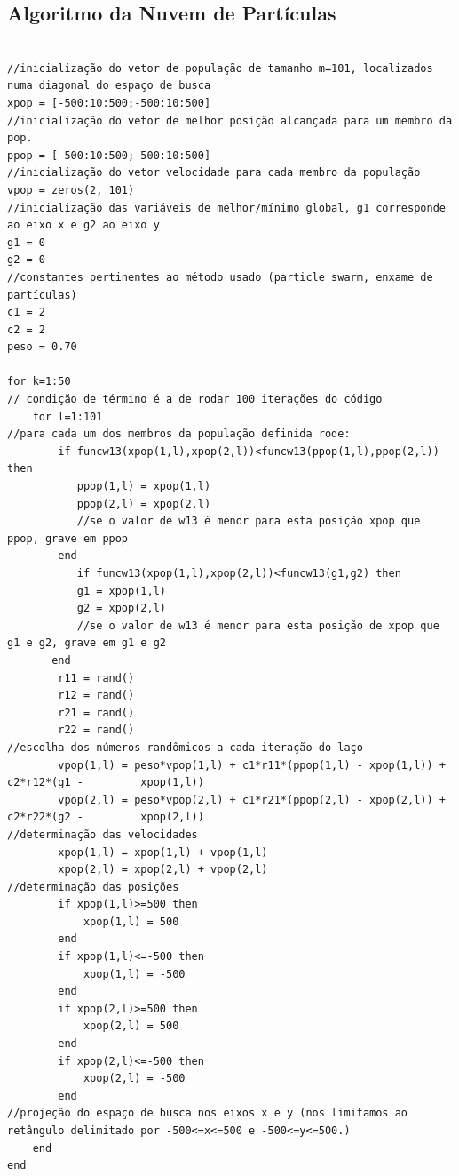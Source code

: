 \subsection*{Algoritmo da Nuvem de Partículas}
\begin{verbatim}

//inicialização do vetor de população de tamanho m=101, localizados numa diagonal do espaço de busca
xpop = [-500:10:500;-500:10:500]
//inicialização do vetor de melhor posição alcançada para um membro da pop.
ppop = [-500:10:500;-500:10:500]
//inicialização do vetor velocidade para cada membro da população
vpop = zeros(2, 101)
//inicialização das variáveis de melhor/mínimo global, g1 corresponde ao eixo x e g2 ao eixo y
g1 = 0
g2 = 0 
//constantes pertinentes ao método usado (particle swarm, enxame de partículas) 
c1 = 2
c2 = 2
peso = 0.70

for k=1:50
// condição de término é a de rodar 100 iterações do código
    for l=1:101
//para cada um dos membros da população definida rode:
        if funcw13(xpop(1,l),xpop(2,l))<funcw13(ppop(1,l),ppop(2,l)) then
           ppop(1,l) = xpop(1,l)
           ppop(2,l) = xpop(2,l)
           //se o valor de w13 é menor para esta posição xpop que ppop, grave em ppop
        end
           if funcw13(xpop(1,l),xpop(2,l))<funcw13(g1,g2) then
           g1 = xpop(1,l)
           g2 = xpop(2,l)
           //se o valor de w13 é menor para esta posição de xpop que g1 e g2, grave em g1 e g2
       end
        r11 = rand()
        r12 = rand()
        r21 = rand()
        r22 = rand()
//escolha dos números randômicos a cada iteração do laço
        vpop(1,l) = peso*vpop(1,l) + c1*r11*(ppop(1,l) - xpop(1,l)) + c2*r12*(g1 -         xpop(1,l))
        vpop(2,l) = peso*vpop(2,l) + c1*r21*(ppop(2,l) - xpop(2,l)) + c2*r22*(g2 -         xpop(2,l))
//determinação das velocidades
        xpop(1,l) = xpop(1,l) + vpop(1,l)
        xpop(2,l) = xpop(2,l) + vpop(2,l)
//determinação das posições
        if xpop(1,l)>=500 then
            xpop(1,l) = 500
        end
        if xpop(1,l)<=-500 then
            xpop(1,l) = -500
        end
        if xpop(2,l)>=500 then
            xpop(2,l) = 500
        end
        if xpop(2,l)<=-500 then
            xpop(2,l) = -500
        end
//projeção do espaço de busca nos eixos x e y (nos limitamos ao retângulo delimitado por -500<=x<=500 e -500<=y<=500.)
    end
end
\end{verbatim}

